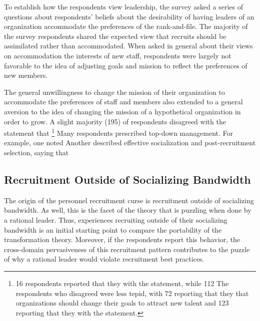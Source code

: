 To establish how the respondents view leadership, the survey asked a series of questions about respondents' beliefs about the desirability of having leaders of an organization accommodate the preferences of the rank-and-file. The majority of the survey respondents shared the expected view that recruits should be assimilated rather than accommodated. When asked in general about their views on accommodation the interests of new staff, respondents were largely not favorable to the idea of adjusting goals and mission to reflect the preferences of new members. 

The general unwillingness to change the mission of their organization to accommodate the preferences of staff and members also extended to a general aversion to the idea of changing the mission of a hypothetical organization in order to grow.  A slight majority (195) of respondents disagreed with the statement that \footnote{16 respondents reported that they  with the statement, while 112  The respondents who disagreed were less tepid, with 72 reporting that they  that organizations should change their goals to attract new talent and 123 reporting that they  with the statement.} Many respondents prescribed top-down management. For example, one noted  Another described effective socialization and post-recruitment selection, saying that 

\subsection{Recruitment Outside of Socializing Bandwidth}

The origin of the personnel recruitment curse is recruitment outside of socializing bandwidth. As well, this is the facet of the theory that is puzzling when done by a rational leader. Thus, experiences recruiting outside of their socializing bandwidth is an initial starting point to compare the portability of the transformation theory. Moreover, if the respondents report this behavior, the cross-domain pervasiveness of this recruitment pattern contributes to the puzzle of why a rational leader would violate recruitment best practices. 

